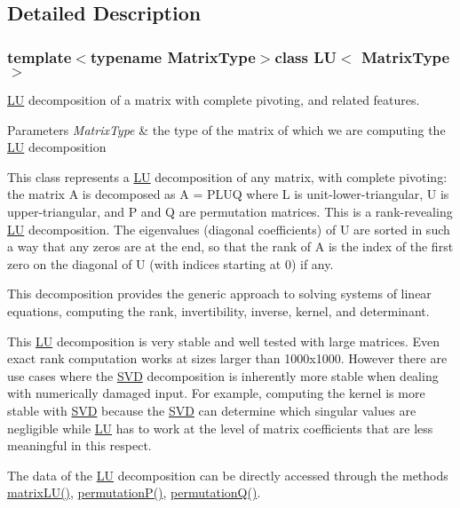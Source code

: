 \subsection{Detailed Description}
\subsubsection*{template$<$typename Matrix\-Type$>$class L\-U$<$ Matrix\-Type $>$}

\hyperlink{class_l_u}{L\-U} decomposition of a matrix with complete pivoting, and related features. 


\begin{DoxyParams}{Parameters}
{\em Matrix\-Type} & the type of the matrix of which we are computing the \hyperlink{class_l_u}{L\-U} decomposition\\
\hline
\end{DoxyParams}
This class represents a \hyperlink{class_l_u}{L\-U} decomposition of any matrix, with complete pivoting\-: the matrix A is decomposed as A = P\-L\-U\-Q where L is unit-\/lower-\/triangular, U is upper-\/triangular, and P and Q are permutation matrices. This is a rank-\/revealing \hyperlink{class_l_u}{L\-U} decomposition. The eigenvalues (diagonal coefficients) of U are sorted in such a way that any zeros are at the end, so that the rank of A is the index of the first zero on the diagonal of U (with indices starting at 0) if any.

This decomposition provides the generic approach to solving systems of linear equations, computing the rank, invertibility, inverse, kernel, and determinant.

This \hyperlink{class_l_u}{L\-U} decomposition is very stable and well tested with large matrices. Even exact rank computation works at sizes larger than 1000x1000. However there are use cases where the \hyperlink{class_s_v_d}{S\-V\-D} decomposition is inherently more stable when dealing with numerically damaged input. For example, computing the kernel is more stable with \hyperlink{class_s_v_d}{S\-V\-D} because the \hyperlink{class_s_v_d}{S\-V\-D} can determine which singular values are negligible while \hyperlink{class_l_u}{L\-U} has to work at the level of matrix coefficients that are less meaningful in this respect.

The data of the \hyperlink{class_l_u}{L\-U} decomposition can be directly accessed through the methods \hyperlink{class_l_u_a502973e871891b161b1cc66f105728cc}{matrix\-L\-U()}, \hyperlink{class_l_u_a734b5fd0ec8281e6985e2a90bc1e1570}{permutation\-P()}, \hyperlink{class_l_u_afb01cfd53e082fb9a7d371766b50ef96}{permutation\-Q()}.

